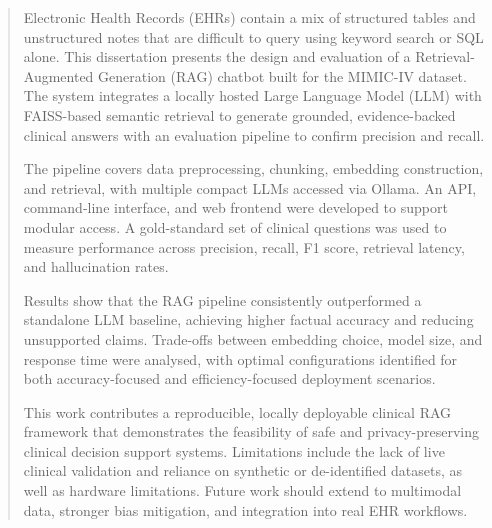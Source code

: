\begin{abstract}
Electronic Health Records (EHRs) contain a mix of structured tables and unstructured notes that are difficult to query using keyword search or SQL alone. This dissertation presents the design and evaluation of a Retrieval-Augmented Generation (RAG) chatbot built for the MIMIC-IV dataset. The system integrates a locally hosted Large Language Model (LLM) with FAISS-based semantic retrieval to generate grounded, evidence-backed clinical answers with an evaluation pipeline to confirm precision and recall.

The pipeline covers data preprocessing, chunking, embedding construction, and retrieval, with multiple compact LLMs accessed via Ollama. An API, command-line interface, and web frontend were developed to support modular access. A gold-standard set of clinical questions was used to measure performance across precision, recall, F1 score, retrieval latency, and hallucination rates. 

Results show that the RAG pipeline consistently outperformed a standalone LLM baseline, achieving higher factual accuracy and reducing unsupported claims. Trade-offs between embedding choice, model size, and response time were analysed, with optimal configurations identified for both accuracy-focused and efficiency-focused deployment scenarios. 

This work contributes a reproducible, locally deployable clinical RAG framework that demonstrates the feasibility of safe and privacy-preserving clinical decision support systems. Limitations include the lack of live clinical validation and reliance on synthetic or de-identified datasets, as well as hardware limitations. Future work should extend to multimodal data, stronger bias mitigation, and integration into real EHR workflows.
\end{abstract}
